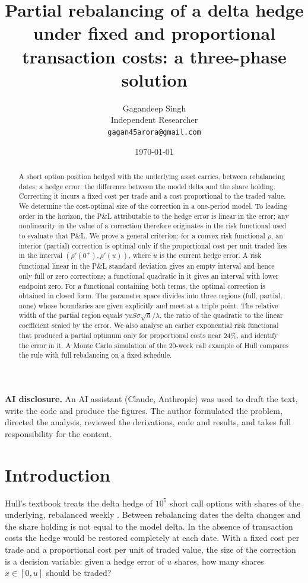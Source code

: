\documentclass[11pt,a4paper]{article}
\title{\textbf{Partial rebalancing of a delta hedge under fixed and proportional
transaction costs: a three-phase solution}}
\author{Gagandeep Singh\\[2pt]
\small Independent Researcher\\
\small \texttt{gagan45arora@gmail.com}}
\date{\today}
\theoremstyle{remark}
\begin{document}
\maketitle

\begin{abstract}
A short option position hedged with the underlying asset carries, between rebalancing
dates, a hedge error: the difference between the model delta and the share holding.
Correcting it incurs a fixed cost per trade and a cost proportional to the traded value.
We determine the cost-optimal size of the correction in a one-period model. To leading
order in the horizon, the P\&L attributable to the hedge error is linear in the error;
any nonlinearity in the value of a correction therefore originates in the risk functional
used to evaluate that P\&L. We prove a general criterion: for a convex risk functional
$\rho$, an interior (partial) correction is optimal only if the proportional cost per unit
traded lies in the interval $(\rho'(0^+), \rho'(u))$, where $u$ is the current hedge
error. A risk functional linear in the P\&L standard deviation gives an empty interval and
hence only full or zero corrections; a functional quadratic in it gives an interval with
lower endpoint zero. For a functional containing both terms, the optimal correction is
obtained in closed form. The parameter space divides into three regions (full, partial,
none) whose boundaries are given explicitly and meet at a triple point. The relative width
of the partial region equals $\gamma uS\sigma\sqrt h/\lambda$, the ratio of the quadratic
to the linear coefficient scaled by the error. We also analyse an earlier exponential risk
functional that produced a partial optimum only for proportional costs near 24\%, and
identify the error in it. A Monte Carlo simulation of the 20-week call example of Hull
compares the rule with full rebalancing on a fixed schedule.
\end{abstract}

\noindent\small\textbf{AI disclosure.} An AI assistant (Claude, Anthropic) was used to draft
the text, write the code and produce the figures. The author formulated the problem,
directed the analysis, reviewed the derivations, code and results, and takes full
responsibility for the content.\normalsize

\section{Introduction}

Hull's textbook treats the delta hedge of $10^5$ short call options with shares of the
underlying, rebalanced weekly \cite[ch.~19]{hull}. Between rebalancing dates the delta
changes and the share holding is not equal to the model delta. In the absence of
transaction costs the hedge would be restored completely at each date. With a fixed cost
per trade and a proportional cost per unit of traded value, the size of the correction is a
decision variable: given a hedge error of $u$ shares, how many shares $x\in[0,u]$ should
be traded?
\end{document}
